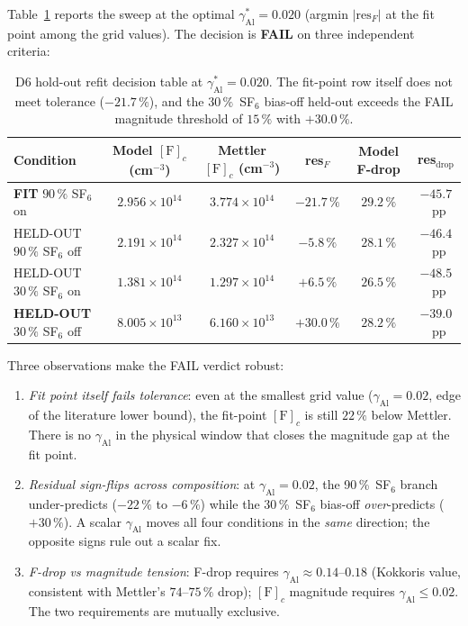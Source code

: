 \documentclass[11pt,a4paper]{report}
\begin{document}
Table~\ref{tab:d6-decision} reports the sweep at the optimal $\gamma_\mathrm{Al}^{*}=0.020$ (argmin $|\mathrm{res}_F|$ at the fit point among the grid values).  The decision is \textbf{FAIL} on three independent criteria:

\begin{table}[H]
  \centering
  \caption{D6 hold-out refit decision table at $\gamma_\mathrm{Al}^{*}=0.020$.  The fit-point row itself does not meet tolerance ($-21.7\,\%$), and the $30\,\%$~SF$_6$ bias-off held-out exceeds the FAIL magnitude threshold of $15\,\%$ with $+30.0\,\%$.}
  \label{tab:d6-decision}
  \begin{tabular}{lccccc}
    \toprule
    Condition & Model $[\mathrm{F}]_c$ (cm$^{-3}$) & Mettler $[\mathrm{F}]_c$ (cm$^{-3}$) & res$_F$ & Model F-drop & res$_\mathrm{drop}$ \\
    \midrule
    \textbf{FIT} $90\,\%$ SF$_6$ on   & $2.956\times 10^{14}$ & $3.774\times 10^{14}$ & $-21.7\,\%$ & $29.2\,\%$ & $-45.7$~pp \\
    HELD-OUT $90\,\%$ SF$_6$ off      & $2.191\times 10^{14}$ & $2.327\times 10^{14}$ & $-5.8\,\%$  & $28.1\,\%$ & $-46.4$~pp \\
    HELD-OUT $30\,\%$ SF$_6$ on       & $1.381\times 10^{14}$ & $1.297\times 10^{14}$ & $+6.5\,\%$  & $26.5\,\%$ & $-48.5$~pp \\
    \textbf{HELD-OUT} $30\,\%$ SF$_6$ off & $8.005\times 10^{13}$ & $6.160\times 10^{13}$ & $\mathbf{+30.0\,\%}$ & $28.2\,\%$ & $-39.0$~pp \\
    \bottomrule
  \end{tabular}
\end{table}

Three observations make the FAIL verdict robust:

\begin{enumerate}
  \item \emph{Fit point itself fails tolerance}: even at the smallest grid value ($\gamma_\mathrm{Al}=0.02$, edge of the literature lower bound), the fit-point $[\mathrm{F}]_c$ is still $22\,\%$ below Mettler.  There is no $\gamma_\mathrm{Al}$ in the physical window that closes the magnitude gap at the fit point.
  \item \emph{Residual sign-flips across composition}: at $\gamma_\mathrm{Al}=0.02$, the 90\,\%~SF$_6$ branch under-predicts ($-22\,\%$ to $-6\,\%$) while the 30\,\%~SF$_6$ bias-off \emph{over}-predicts ($+30\,\%$).  A scalar $\gamma_\mathrm{Al}$ moves all four conditions in the \emph{same} direction; the opposite signs rule out a scalar fix.
  \item \emph{F-drop vs magnitude tension}: F-drop requires $\gamma_\mathrm{Al}\approx 0.14$--$0.18$ (Kokkoris value, consistent with Mettler's $74$--$75\,\%$ drop); $[\mathrm{F}]_c$ magnitude requires $\gamma_\mathrm{Al}\leq 0.02$.  The two requirements are mutually exclusive.
\end{enumerate}
\end{document}

